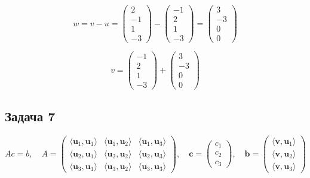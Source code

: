 \documentclass[a4paper,12pt]{article}
\begin{document}
\[
w = v - u = \begin{pmatrix}
    2 \\ -1 \\ 1 \\ -3
\end{pmatrix} - \begin{pmatrix}
    -1 \\ 2 \\ 1 \\ -3 
\end{pmatrix} = \begin{pmatrix}
    3 \\ -3 \\ 0 \\ 0
\end{pmatrix}
\]

\[
v = \begin{pmatrix}
    -1 \\ 2 \\ 1 \\ -3 
\end{pmatrix} + \begin{pmatrix}
    3 \\ -3 \\ 0 \\ 0
\end{pmatrix}
\]

\subsection{Задача 7}

\[
Ac = b, \quad A = 
\begin{pmatrix}
    \langle \mathbf{u}_1, \mathbf{u}_1 \rangle & \langle \mathbf{u}_1, \mathbf{u}_2 \rangle & \langle \mathbf{u}_1, \mathbf{u}_3 \rangle \\
    \langle \mathbf{u}_2, \mathbf{u}_1 \rangle & \langle \mathbf{u}_2, \mathbf{u}_2 \rangle & \langle \mathbf{u}_2, \mathbf{u}_3 \rangle \\
    \langle \mathbf{u}_3, \mathbf{u}_1 \rangle & \langle \mathbf{u}_3, \mathbf{u}_2 \rangle & \langle \mathbf{u}_3, \mathbf{u}_3 \rangle 
\end{pmatrix},
\quad
\mathbf{c} =
\begin{pmatrix}
    c_1 \\
    c_2 \\
    c_3
\end{pmatrix},
\quad
\mathbf{b} =
\begin{pmatrix}
    \langle \mathbf{v}, \mathbf{u}_1 \rangle \\
    \langle \mathbf{v}, \mathbf{u}_2 \rangle \\
    \langle \mathbf{v}, \mathbf{u}_3 \rangle 
\end{pmatrix}
\]
\end{document}

